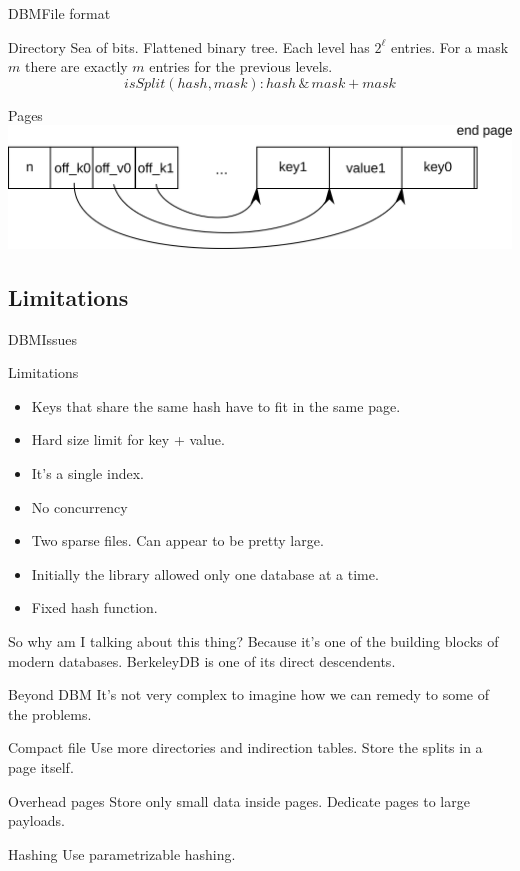 \documentclass{beamer}
\begin{document}
\begin{frame}{DBM}{File format}
\begin{block}{Directory}
Sea of bits. Flattened binary tree. Each level has $2^\ell$ entries. For a
mask $m$ there are exactly $m$ entries for the previous levels.
$$isSplit(hash, mask): hash \,\&\, mask + mask$$
\end{block}

\begin{block}{Pages}
\center \includegraphics[scale=0.7]{dbm_page.png}
\end{block}
\end{frame}

\subsection{Limitations}

\begin{frame}{DBM}{Issues}
\begin{block}{Limitations}
\begin{itemize}
\item Keys that share the same hash have to fit in the same page.
\item Hard size limit for key + value.
\item It's a single index.
\item No concurrency
\item Two sparse files. Can appear to be pretty large.
\item Initially the library allowed only one database at a time.
\item Fixed hash function.
\end{itemize}
\end{block}

So why am I talking about this thing? Because it's one of the building
blocks of modern databases. BerkeleyDB is one of its direct descendents.
\end{frame}

\begin{frame}{Beyond DBM}
It's not very complex to imagine how we can remedy to some of the problems.

\begin{block}{Compact file}
Use more directories and indirection tables. Store the splits in a page
itself.
\end{block}

\begin{block}{Overhead pages}
Store only small data inside pages. Dedicate pages to large payloads.
\end{block}

\begin{block}{Hashing}
Use parametrizable hashing.
\end{block}

\end{frame}
\end{document}
